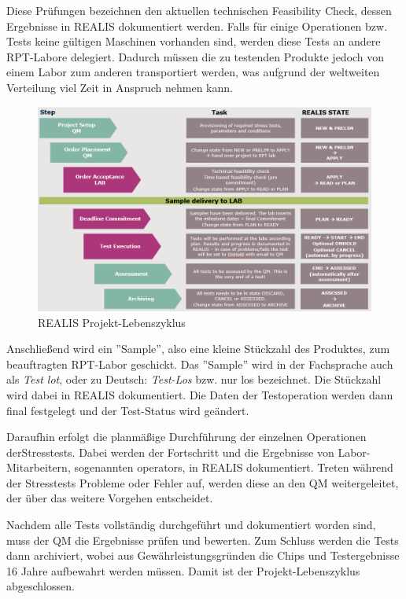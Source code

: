 Diese Prüfungen bezeichnen den aktuellen technischen Feasibility Check, dessen Ergebnisse in \gls{REALIS} dokumentiert werden.
Falls für einige Operationen bzw. Tests keine gültigen Maschinen vorhanden sind, werden diese Tests an andere \gls{RPT}-Labore delegiert. Dadurch müssen die zu testenden Produkte jedoch von einem Labor zum anderen transportiert werden, was aufgrund der weltweiten Verteilung viel Zeit in Anspruch nehmen kann.

\begin{figure}[!h]
    \centering
    \includegraphics[width=1\textwidth]{bilder/realis-project-lifecycle.png}
    \caption{REALIS Projekt-Lebenszyklus \cite{REALISWikiIntern}}
    \label{fig:realis-project-lifecycle}
\end{figure}

Anschließend wird ein ''Sample'', also eine kleine Stückzahl des Produktes, zum beauftragten \gls{RPT}-Labor geschickt. Das ''Sample'' wird in der Fachsprache auch als \textit{Test lot}, oder zu Deutsch: \textit{Test-Los} bzw. nur \gls{los} bezeichnet. Die Stückzahl wird dabei in \gls{REALIS} dokumentiert. Die  Daten der Testoperation werden dann final festgelegt und der Test-Status wird geändert.

Daraufhin erfolgt die planmäßige Durchführung der einzelnen Operationen der\linebreak Stresstests. Dabei werden der Fortschritt und die Ergebnisse von Labor-Mitarbeitern, sogenannten \glspl{operator}, in \gls{REALIS} dokumentiert. Treten während der Stresstests Probleme oder Fehler auf, werden diese an den \gls{QM} weitergeleitet, der über das weitere Vorgehen entscheidet.

Nachdem alle Tests vollständig durchgeführt und dokumentiert worden sind, muss der \gls{QM} die Ergebnisse prüfen und bewerten. Zum Schluss werden die Tests dann archiviert, wobei aus Gewährleistungsgründen die Chips und Testergebnisse 16 Jahre aufbewahrt werden müssen. Damit ist der Projekt-Lebenszyklus abgeschlossen.

